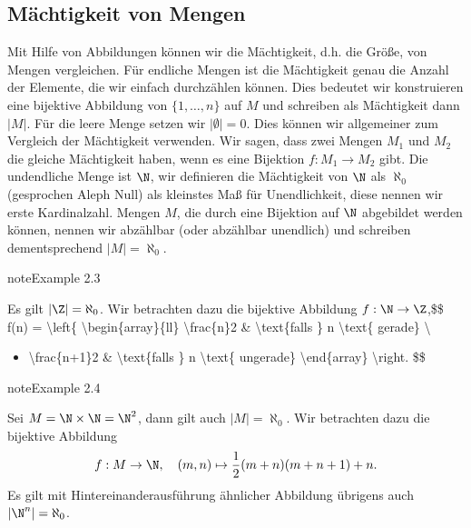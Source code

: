 \documentclass[letterpaper,10pt,english]{jupyterBook}
\begin{document}
\subsection{Mächtigkeit von Mengen}
\label{\detokenize{grundlagen/mengenlogik:machtigkeit-von-mengen}}
Mit Hilfe von Abbildungen können wir die Mächtigkeit, d.h. die Größe, von Mengen vergleichen. Für endliche Mengen ist die Mächtigkeit genau die Anzahl der Elemente, die wir einfach durchzählen können. Dies bedeutet wir konstruieren eine bijektive Abbildung von \(\{1,\ldots,n\}\) auf \(M\) und schreiben als Mächtigkeit dann \(\vert M \vert\). Für die leere Menge setzen wir \(\vert \emptyset \vert =0\). Dies können wir allgemeiner zum Vergleich der Mächtigkeit verwenden. Wir sagen, dass zwei Mengen \(M_1\) und \(M_2\) die gleiche Mächtigkeit haben, wenn es eine Bijektion \(f: M_1 \rightarrow M_2\) gibt.
Die  undendliche Menge ist \(\N\), wir definieren die Mächtigkeit von \(\N\) als \(\aleph_0\) (gesprochen Aleph Null) als kleinstes Maß für Unendlichkeit, diese nennen wir erste Kardinalzahl. Mengen \(M\), die durch eine Bijektion auf \(\N\) abgebildet werden können, nennen wir abzählbar (oder abzählbar unendlich) und schreiben dementsprechend \(|M|=\aleph_0\).
\label{grundlagen/mengenlogik:example-12}
\begin{sphinxadmonition}{note}{Example 2.3}



Es gilt \(|\Z|=\aleph_0\). Wir betrachten dazu die bijektive Abbildung \(f: \N \rightarrow \Z\),\$\$ f(n) = \textbackslash{}left\{ \textbackslash{}begin\{array\}\{ll\} \textbackslash{}frac\{n\}2 \& \textbackslash{}text\{falls \} n \textbackslash{}text\{ gerade\} \textbackslash{}
\begin{itemize}
\item {} 
\textbackslash{}frac\{n+1\}2 \& \textbackslash{}text\{falls \} n \textbackslash{}text\{ ungerade\} \textbackslash{}end\{array\} \textbackslash{}right. \$\$

\end{itemize}
\end{sphinxadmonition}
\label{grundlagen/mengenlogik:example-13}
\begin{sphinxadmonition}{note}{Example 2.4}



Sei \(M= \N \times \N = \N^2\), dann gilt auch \(|M|=\aleph_0\). Wir betrachten dazu die bijektive Abbildung
\begin{equation*}
\begin{split}f: M \rightarrow \N, \quad (m,n) \mapsto \frac{1}2(m+n)(m+n+1) + n.\end{split}
\end{equation*}
Es gilt mit Hintereinanderausführung ähnlicher Abbildung übrigens auch \(|\N^n|=\aleph_0\).
\end{sphinxadmonition}
\end{document}

